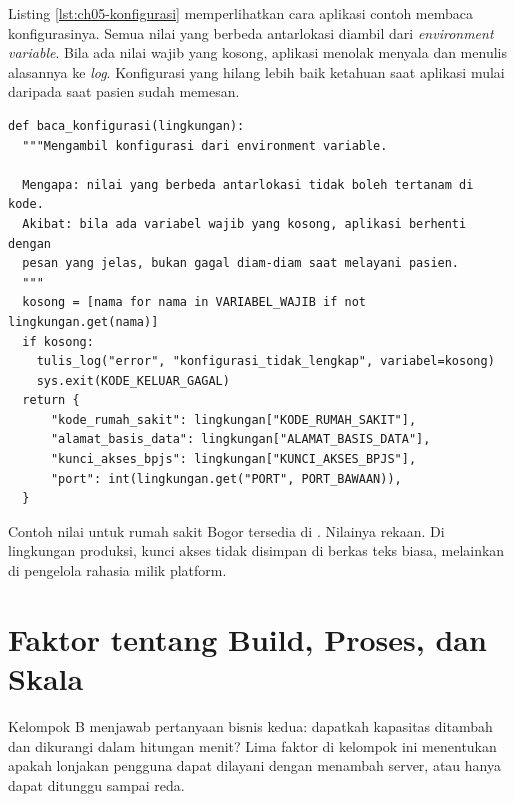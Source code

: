 \begin{pendalaman}[title={Pendalaman Teknis (opsional): Konfigurasi dari Environment Variable}]
  Listing \ref{lst:ch05-konfigurasi} memperlihatkan cara aplikasi contoh membaca
  konfigurasinya. Semua nilai yang berbeda antarlokasi diambil dari \textit{environment
  variable}. Bila ada nilai wajib yang kosong, aplikasi menolak menyala dan menulis
  alasannya ke \textit{log}. Konfigurasi yang hilang lebih baik ketahuan saat aplikasi
  mulai daripada saat pasien sudah memesan.

\begin{lstlisting}[style=ch05python, caption={Membaca konfigurasi dari \textit{environment variable}, tersedia di \berkas{sources/chapter05/contoh-aplikasi-konfigurasi/app.py}}, label={lst:ch05-konfigurasi}]
def baca_konfigurasi(lingkungan):
  """Mengambil konfigurasi dari environment variable.

  Mengapa: nilai yang berbeda antarlokasi tidak boleh tertanam di kode.
  Akibat: bila ada variabel wajib yang kosong, aplikasi berhenti dengan
  pesan yang jelas, bukan gagal diam-diam saat melayani pasien.
  """
  kosong = [nama for nama in VARIABEL_WAJIB if not lingkungan.get(nama)]
  if kosong:
    tulis_log("error", "konfigurasi_tidak_lengkap", variabel=kosong)
    sys.exit(KODE_KELUAR_GAGAL)
  return {
      "kode_rumah_sakit": lingkungan["KODE_RUMAH_SAKIT"],
      "alamat_basis_data": lingkungan["ALAMAT_BASIS_DATA"],
      "kunci_akses_bpjs": lingkungan["KUNCI_AKSES_BPJS"],
      "port": int(lingkungan.get("PORT", PORT_BAWAAN)),
  }
\end{lstlisting}

  Contoh nilai untuk rumah sakit Bogor tersedia di
  . Nilainya
  rekaan. Di lingkungan produksi, kunci akses tidak disimpan di berkas teks biasa,
  melainkan di pengelola rahasia milik platform.
\end{pendalaman}

\section{Faktor tentang Build, Proses, dan Skala}
\label{sec:ch05-kelompok-b}

Kelompok B menjawab pertanyaan bisnis kedua: dapatkah kapasitas ditambah dan dikurangi
dalam hitungan menit? Lima faktor di kelompok ini menentukan apakah lonjakan pengguna dapat
dilayani dengan menambah server, atau hanya dapat ditunggu sampai reda.

